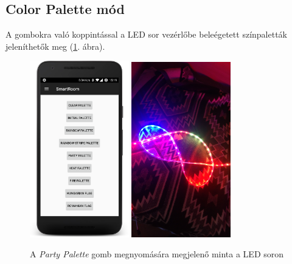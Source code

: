 \documentclass[../main.tex]{subfiles}
\begin{document}
        \subsection{Color Palette mód}
            A gombokra való koppintással a LED sor vezérlőbe beleégetett színpaletták jeleníthetők meg (\ref{fig:color_palettes}. ábra).
            \begin{figure}[h!]
                \centering
                    \includegraphics[width=4.3cm]{android_res/screen_pictures/color_palette_01}
                    \includegraphics[width=4.3cm]{android_res/color_palette_11}
                \caption{A \textit{Party Palette} gomb megnyomására megjelenő minta a LED soron}
                \label{fig:color_palettes}
            \end{figure}
        
\end{document}
